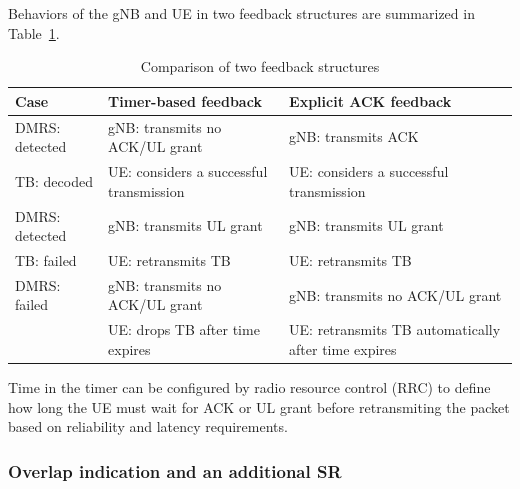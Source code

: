 \documentclass{ieeeaccess}
\begin{document}
Behaviors of the gNB and UE in two feedback structures are summarized in Table~\ref{tab1}.

\begin{table}[htbp]
\caption{Comparison of two feedback structures}
\begin{center}
\begin{tabular}{|p{8em}|p{8em}|p{8em}|}
 \hline
 \textbf{Case} & \textbf{Timer-based feedback}&\textbf{Explicit ACK feedback}\\
 \hline
 DMRS: detected&gNB: transmits no ACK/UL grant&gNB: transmits ACK\\TB: decoded &UE: considers a successful transmission &UE: considers a successful transmission\\
 \hline
  DMRS: detected&gNB: transmits UL grant &gNB: transmits UL grant\\TB: failed & UE: retransmits TB&UE: retransmits TB\\
 \hline
DMRS: failed&gNB: transmits no ACK/UL grant&gNB: transmits no ACK/UL grant\\ &UE: drops TB after time expires& UE: retransmits TB automatically after time expires\\

 
 \hline
\end{tabular}
\label{tab1}
\end{center}
\vspace{-5mm}
\end{table}

Time in the timer can be configured by radio resource control (RRC) to define how long the UE must wait for ACK or UL grant before retransmiting the packet based on reliability and latency requirements.

\subsubsection{Overlap indication and an additional SR}\label{IIB3}
\end{document}
